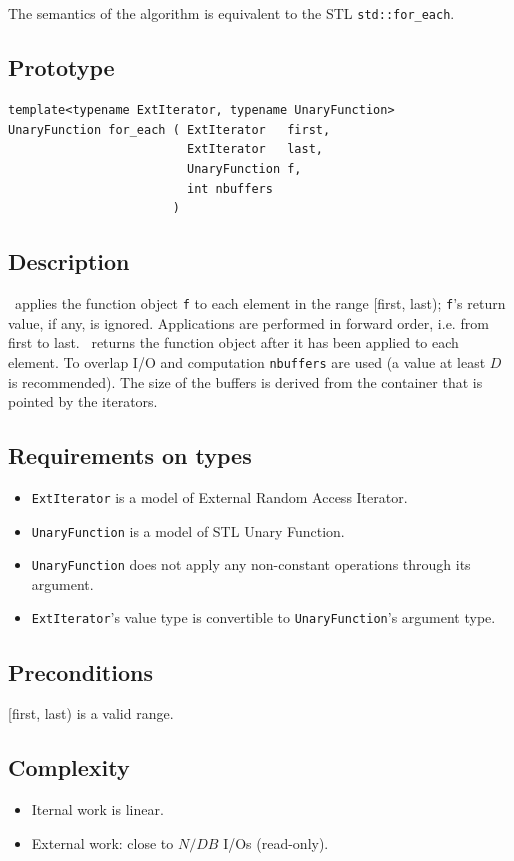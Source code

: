 \documentclass[twoside]{book}
\begin{document}
\subsection{\xforeach}
The semantics of the algorithm is equivalent to the STL
\texttt{std::for\_each}. 

\subsection*{Prototype}
\begin{lstlisting}
template<typename ExtIterator, typename UnaryFunction>
UnaryFunction for_each ( ExtIterator   first,
                         ExtIterator   last,
                         UnaryFunction f,
                         int nbuffers
                       )        
\end{lstlisting}
\subsection*{Description}
\xforeach\ applies the function object \texttt{f} to each element in the range
[first, last); \texttt{f}'s return value, if any, is
ignored. Applications are 
performed in forward order, i.e. from first to last. \xforeach\ returns
the function object after it has been applied to each element. 
 To
overlap I/O and computation \texttt{nbuffers} are used (a value at
least $D$ is recommended). The size of
the buffers is derived from the container that is pointed by the
iterators. 
\subsection*{Requirements on types}
\begin{itemize}
\item \texttt{ExtIterator} is a model of External Random Access
Iterator.
\item \texttt{UnaryFunction} is a model of STL Unary Function.
\item \texttt{UnaryFunction} does not apply any non-constant
operations through its argument.
\item \texttt{ExtIterator}'s value type is convertible to
\texttt{UnaryFunction}'s argument type.
\end{itemize}
\subsection*{Preconditions}
[first, last) is a valid range.
\subsection*{Complexity}
\begin{itemize}
\item Iternal work is linear.
\item External work: close to $N/DB$ I/Os (read-only).
\end{itemize}
\end{document}

